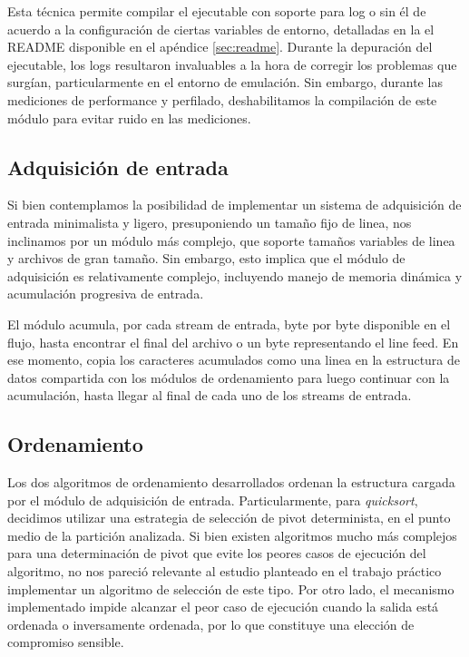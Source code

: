 \documentclass[a4paper,11pt]{article}
\begin{document}
Esta técnica permite compilar el ejecutable con soporte para log o sin él de
acuerdo a la configuración de ciertas variables de entorno, detalladas en la el
README disponible en el apéndice \ref{sec:readme}. Durante la depuración del
ejecutable, los logs resultaron invaluables a la hora de corregir los problemas
que surgían, particularmente en el entorno de emulación.  Sin embargo, durante
las mediciones de performance y perfilado, deshabilitamos la compilación de
este módulo para evitar ruido en las mediciones.

\subsection{Adquisición de entrada}

Si bien contemplamos la posibilidad de implementar un sistema de adquisición de
entrada minimalista y ligero, presuponiendo un tamaño fijo de linea, nos
inclinamos por un módulo más complejo, que soporte tamaños variables de linea y
archivos de gran tamaño. Sin embargo, esto implica que el módulo de adquisición
es relativamente complejo, incluyendo manejo de memoria dinámica y acumulación
progresiva de entrada.

El módulo acumula, por cada stream de entrada, byte por byte disponible en el
flujo, hasta encontrar el final del archivo o un byte representando el line
feed. En ese momento, copia los caracteres acumulados como una linea en la
estructura de datos compartida con los módulos de ordenamiento para luego
continuar con la acumulación, hasta llegar al final de cada uno de los streams
de entrada.

\subsection{Ordenamiento}\label{sec:ord}

Los dos algoritmos de ordenamiento desarrollados ordenan la estructura cargada
por el módulo de adquisición de entrada. Particularmente, para
\textit{quicksort}, decidimos utilizar una estrategia de selección de pivot
determinista, en el punto medio de la partición analizada. Si bien existen
algoritmos mucho más complejos para una determinación de pivot que evite los
peores casos de ejecución del algoritmo, no nos pareció relevante al estudio
planteado en el trabajo práctico implementar un algoritmo de selección de este
tipo. Por otro lado, el mecanismo implementado impide alcanzar el peor caso de
ejecución cuando la salida está ordenada o inversamente ordenada, por lo que
constituye una elección de compromiso sensible.
\end{document}
